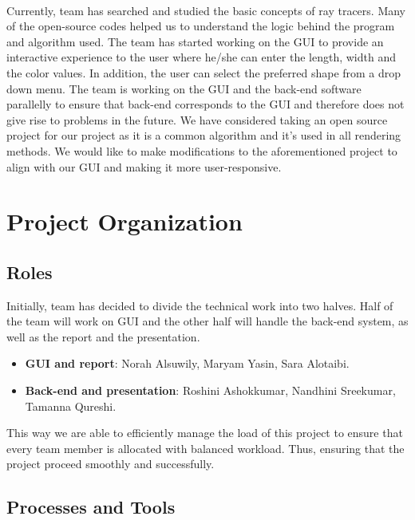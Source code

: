 \documentclass{article}
\begin{document}
\paragraph{}
Currently, team has searched and studied the basic concepts of ray tracers. Many of the open-source codes helped us to understand the logic behind the program and algorithm used. The team has started working on the GUI to provide an interactive experience to the user where he/she can enter the length, width and the color values. In addition, the user can select the preferred shape from a drop down menu. 
\newline 
The team is working on the GUI and the back-end software parallelly to ensure that back-end corresponds to the GUI and therefore does not give rise to problems in the future. We have considered taking an open source project for our project as it is a common algorithm and it's used in all rendering methods. We would like to make modifications to the aforementioned project to align with our GUI and making it more user-responsive. 




\section{Project Organization}

\subsection{Roles}
Initially, team has decided to divide the technical work into two halves. Half of the team will work on GUI and the other half will handle the back-end system, as well as the report and the presentation.  
\begin{itemize}

\item \textbf{GUI and report}: Norah Alsuwily, Maryam Yasin, Sara Alotaibi. 
\item \textbf{Back-end and presentation}: Roshini Ashokkumar, Nandhini Sreekumar, Tamanna Qureshi. 

\end{itemize}

This way we are able to efficiently manage the load of this project to ensure that every team member is allocated with balanced workload. Thus, ensuring that the project proceed smoothly and successfully. 


\subsection{Processes and Tools}
\end{document}
